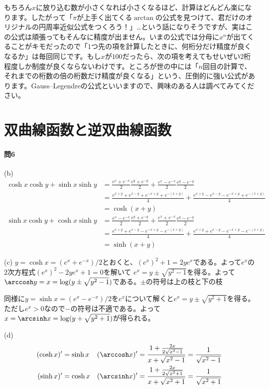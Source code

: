 もちろん$x$に放り込む数が小さくなれば小さくなるほど、計算はどんどん楽になります。したがって「$\pi$が上手く出てくる$\arctan$の公式を見つけて、君だけのオリジナルの円周率近似公式をつくろう！」…という話になりそうですが、実はこの公式は頑張ってもそんなに精度が出ません。いまの公式では分母に$x^n$が出てくることがキモだったので「$1$つ先の項を計算したときに、何桁分だけ精度が良くなるか」は毎回同じです。もし$x$が$100$だったら、次の項を考えてもせいぜい$2$桁程度しか制度が良くならないわけです。ところが世の中には「$n$回目の計算で、それまでの桁数の倍の桁数だけ精度が良くなる」という、圧倒的に強い公式があります。Gauss--Legendreの公式といいますので、興味のある人は調べてみてください。

\section{双曲線函数と逆双曲線函数}


\paragraph{問6}
(b)
\begin{align*}
\cosh x \cosh y + \sinh x \sinh y
&= \frac{e^x + e^{-x}}{2} \frac{e^y + e^{-y}}{2} + \frac{e^x - e^{-x}}{2}\frac{e^y - e^{-y}}{2} \\
&= \frac{e^{x+y} + e^{x-y} + e^{-x+y} + e^{-(x+y)}}{4} + \frac{e^{x+y} - e^{x-y} - e^{-x+y} + e^{-(x+y)}}{4} \\
&= \cosh(x+y) \\
\sinh x \cosh y + \cosh x \sinh y
&= \frac{e^x - e^{-x}}{2} \frac{e^y + e^{-y}}{2} + \frac{e^x + e^{-x}}{2}\frac{e^y - e^{-y}}{2} \\
&= \frac{e^{x+y} + e^{x-y} - e^{-x+y} - e^{-(x+y)}}{4} + \frac{e^{x+y} + e^{x-y} - e^{-x+y} - e^{-(x+y)}}{4} \\
&= \sinh(x+y)
\end{align*}

\noindent (c) 
$y=\cosh x = (e^x+e^{-x})/2$とおくと、$(e^x)^2 + 1 = 2ye^x$である。よって$e^x$の$2$次方程式$(e^x)^2 - 2y e^x+1=0$を解いて
$e^x = y\pm\sqrt{y^2-1}$を得る。よって$\arccosh y = x = \log(y\pm\sqrt{y^2-1})$である。$\pm$の符号は上の枝と下の枝

同様に$y=\sinh x = (e^x - e^{-x})/2$を$e^x$について解くと$e^x=y\pm\sqrt{y^2+1}$を得る。ただし$e^x>0$なので$-$の符号は不適である。よって$x=\arcsinh x=\log(y+\sqrt{y^2+1})$が得られる。

\noindent (d)
\begin{align*}
(\cosh x)' &= \sinh x & 
(\arccosh x)' &= \frac{1+\frac{2x}{2\sqrt{x^2-1}}}{x+\sqrt{x^2-1}} = \frac{1}{\sqrt{x^2-1}} \\
(\sinh x)' &= \cosh x &
(\arcsinh x)' &= \frac{1+\frac{2x}{2\sqrt{x^2+1}}}{x+\sqrt{x^2+1}} = \frac{1}{\sqrt{x^2+1}}
\end{align*}
